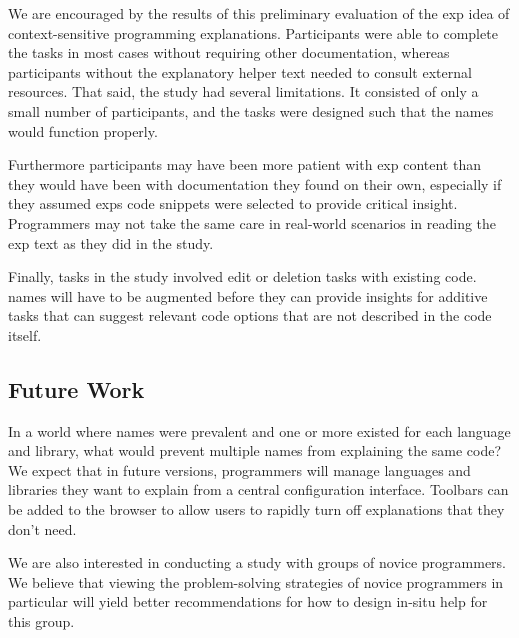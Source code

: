 We are encouraged by the results of this preliminary evaluation of the \gls{exp} idea of context-sensitive programming explanations.
Participants were able to complete the tasks in most cases without requiring other documentation, whereas participants without the explanatory helper text needed to consult external resources.
That said, the study had several limitations.  It consisted of only a small number of participants, and the tasks were designed such that the \glspl{name} would function properly. 

Furthermore participants may have been more patient with \gls{exp} content than they would have been with documentation they found on their own, especially if they assumed \glspl{exp} code snippets were selected to provide critical insight.
Programmers may not take the same care in real-world scenarios in reading the \gls{exp} text as they did in the study.

Finally, tasks in the study involved edit or deletion tasks with existing code.
\Glspl{name} will have to be augmented before they can provide insights for additive tasks that can suggest relevant code options that are not described in the code itself.

\subsection{Future Work}

In a world where \glspl{name} were prevalent and one or more existed for each language and library, what would prevent multiple \glspl{name} from explaining the same code?
We expect that in future versions, programmers will manage languages and libraries they want to explain from a central configuration interface.
Toolbars can be added to the browser to allow users to rapidly turn off explanations that they don't need.

We are also interested in conducting a study with groups of  novice programmers. We believe that viewing the problem-solving strategies of novice programmers in particular will yield better recommendations for how to design in-situ help for this group.